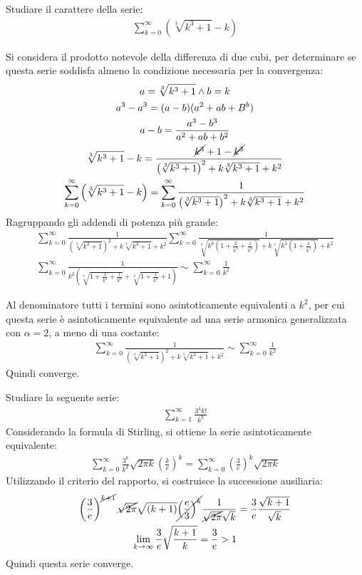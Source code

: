 \documentclass{article}
\numberwithin{equation}{subsection}
\begin{document}
Studiare il carattere della serie:
\begin{gather*}
    \displaystyle\sum_{k=0}^\infty\left(\sqrt[3]{k^3+1}-k\right)
\end{gather*}

Si considera il prodotto notevole della differenza di due cubi, per determinare se questa serie soddisfa almeno la condizione necessaria per la convergenza:
\begin{gather*}
    \displaystyle a=\sqrt[3]{k^3+1}\land b=k\\
    \displaystyle a^3-a^3=(a-b)(a^2+ab+B^b)\\
    \displaystyle a-b=\frac{a^3-b^3}{a^2+ab+b^2}\\
    \displaystyle\sqrt[3]{k^3+1}-k=\frac{\cancel{k^3}+1-\cancel{k^3}}{\left(\sqrt[3]{k^3+1}\right)^2+k\sqrt[3]{k^3+1}+k^2}\\
    \displaystyle\sum_{k=0}^\infty\left(\sqrt[3]{k^3+1}-k\right)=
    \sum_{k=0}^\infty\frac{1}{\left(\sqrt[3]{k^3+1}\right)^2+k\sqrt[3]{k^3+1}+k^2}
\end{gather*}
Ragruppando gli addendi di potenza più grande:
\begin{gather*}
    \sum_{k=0}^\infty\frac{1}{\left(\sqrt[3]{k^3+1}\right)^2+k\sqrt[3]{k^3+1}+k^2}
    \displaystyle\sum_{k=0}^\infty\frac{1}{\sqrt[3]{k^6\left(1+\frac{2}{k^3}+\frac{1}{k^6}\right)}+k\sqrt[3]{k^3\left(1+\frac{1}{k^3}\right)}+k^2}\\
    \sum_{k=0}^\infty\frac{1}{k^2\left(\sqrt[3]{1+\frac{2}{k^3}+\frac{1}{k^6}}+\sqrt[3]{1+\frac{1}{k^3}}+1\right)}
    \sim\sum_{k=0}^\infty\frac{1}{k^2}
\end{gather*}

Al denominatore tutti i termini sono asintoticamente equivalenti a $k^2$, per cui questa serie è asintoticamente equivalente ad una serie armonica generalizzata con $\alpha=2$, a meno di una costante:
\begin{gather*}
    \displaystyle\sum_{k=0}^\infty\frac{1}{\left(\sqrt[3]{k^3+1}\right)^2+k\sqrt[3]{k^3+1}+k^2}
    \sim\sum_{k=0}^\infty\frac{1}{k^2}
\end{gather*} 
Quindi converge. 


Studiare la seguente serie:
\begin{gather*}
    \displaystyle\sum_{k=1}^\infty\frac{3^kk!}{k^k}
\end{gather*}
Considerando la formula di Stirling, si ottiene la serie asintoticamente equivalente:
\begin{gather*}
    \displaystyle\sum_{k=0}^\infty\frac{3^k}{k^k}\sqrt{2\pi k}\left(\frac{k}{e}\right)^k=\sum_{k=0}^\infty\left(\frac{3}{e}\right)^k\sqrt{2\pi k}
\end{gather*}
Utilizzando il criterio del rapporto, si costruisce la successione ausiliaria: 
\begin{gather*}
    \displaystyle\left(\frac{3}{e}\right)^{\cancel{k+1}}\cancel{\sqrt{2\pi}} \sqrt{(k+1)}\cancel{\left(\frac{e}{3}\right)^k}\frac{1}{\cancel{\sqrt{2\pi}} \sqrt{k}}=
    \frac{3}{e}\frac{\sqrt{k+1}}{\sqrt{k}}\\
    \lim_{k\to\infty}\frac{3}{e}\sqrt{\frac{k+1}{k}}=\frac{3}{e}>1
\end{gather*}
Quindi questa serie converge. 
\end{document}
